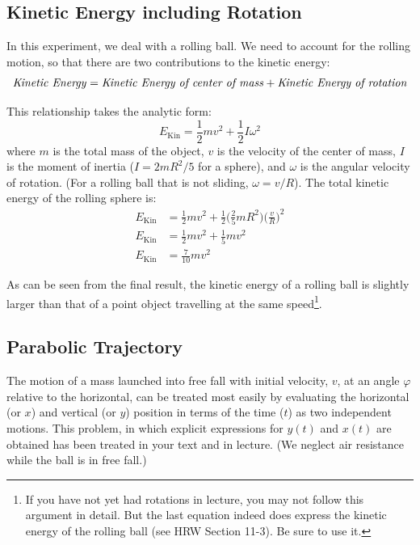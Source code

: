 \subsection{Kinetic Energy including Rotation}

In this experiment, we deal with a rolling ball. We need to account for the rolling motion, so that there are two contributions to the kinetic energy:
\begin{equation}
  \textrm{\emph{Kinetic Energy}} = \textrm{\emph{Kinetic Energy of center of mass}}+\textrm{\emph{Kinetic Energy of rotation}}
\end{equation}

This relationship takes the analytic form:
\begin{equation}
  E_{\textrm{Kin}}=\frac{1}{2}mv^2+\frac{1}{2}I\omega^2
\end{equation}
where $m$ is the total mass of the object, $v$ is the velocity of the center of mass, $I$ is the moment of inertia ($I = 2m R^2/5$ for a sphere), and $\omega$ is the angular velocity of rotation. (For a rolling ball that is not sliding, $\omega=v/R$). The total kinetic energy of the rolling sphere is:
\begin{align}
  E_{\textrm{Kin}}&=\frac{1}{2}mv^2+\frac{1}{2}\bigg(\frac{2}{5}mR^2\bigg)\bigg(\frac{v}{R}\bigg)^2\\
  E_{\textrm{Kin}}&=\frac{1}{2}mv^2+\frac{1}{5}mv^2\\
  E_{\textrm{Kin}}&=\frac{7}{10}mv^2
\end{align}

As can be seen from the final result, the kinetic energy of a rolling ball is slightly larger than that of a point object travelling at the same speed\footnote{If you have not yet had rotations in lecture, you may not follow this argument in detail. But the last equation indeed does express the kinetic energy of the rolling ball (see HRW Section 11-3). Be sure to use it.}.

\subsection{Parabolic Trajectory}
The motion of a mass launched into free fall with initial velocity, $v$, at an angle $\varphi$ relative to the horizontal, can be treated most easily by evaluating the horizontal (or $x$) and vertical (or $y$) position in terms of the time ($t$) as two independent motions. This problem, in which explicit expressions for $y(t)$ and $x(t)$ are obtained has been treated in your text and in lecture. (We neglect air resistance while the ball is in free fall.)

